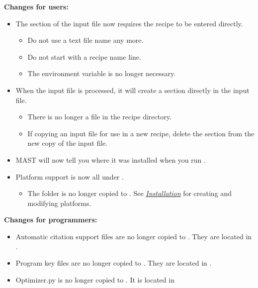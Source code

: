 \documentclass[letterpaper,10pt,english]{sphinxmanual}
\begin{document}
\textbf{Changes for users:}
\begin{itemize}
\item {} 
The  section of the input file now requires the recipe to be entered directly.
\begin{itemize}
\item {} 
Do not use a text file name any more.

\item {} 
Do not start with a recipe name line.

\item {} 
The  environment variable is no longer necessary.

\end{itemize}

\item {} 
When the input file is processed, it will create a  section directly in the input file.
\begin{itemize}
\item {} 
There is no longer a  file in the recipe directory.

\item {} 
If copying an input file for use in a new recipe, delete the  section from the new copy of the input file.

\end{itemize}

\item {} 
MAST will now tell you where it was installed when you run .

\item {} 
Platform support is now all under .
\begin{itemize}
\item {} 
The  folder is no longer copied to . See {\hyperref[1_0_installation::doc]{\emph{Installation}}} for creating and modifying platforms.

\end{itemize}

\end{itemize}

\textbf{Changes for programmers:}
\begin{itemize}
\item {} 
Automatic citation support files are no longer copied to . They are located in .

\item {} 
Program key files are no longer copied to . They are located in .

\item {} 
Optimizer.py is no longer copied to . It is located in 

\end{itemize}
\end{document}
